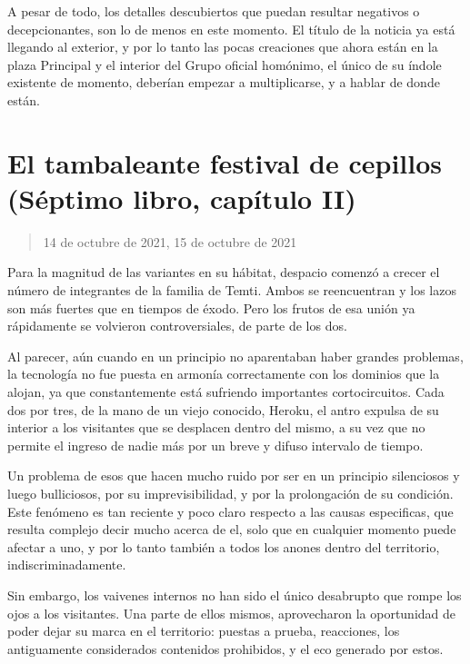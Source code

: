 \documentclass[
]{book}
\begin{document}
A pesar de todo, los detalles descubiertos que puedan resultar negativos o decepcionantes, son lo de menos en este momento. El título de la noticia ya está llegando al exterior, y por lo tanto las pocas creaciones que ahora están en la plaza Principal y el interior del Grupo oficial homónimo, el único de su índole existente de momento, deberían empezar a multiplicarse, y a hablar de donde están.

\hypertarget{el-tambaleante-festival-de-cepillos-suxe9ptimo-libro-capuxedtulo-ii}{%
\section{El tambaleante festival de cepillos (Séptimo libro, capítulo II)}\label{el-tambaleante-festival-de-cepillos-suxe9ptimo-libro-capuxedtulo-ii}}

\begin{quote}
14 de octubre de 2021, 15 de octubre de 2021
\end{quote}

Para la magnitud de las variantes en su hábitat, despacio comenzó a crecer el número de integrantes de la familia de Temti. Ambos se reencuentran y los lazos son más fuertes que en tiempos de éxodo. Pero los frutos de esa unión ya rápidamente se volvieron controversiales, de parte de los dos.

Al parecer, aún cuando en un principio no aparentaban haber grandes problemas, la tecnología no fue puesta en armonía correctamente con los dominios que la alojan, ya que constantemente está sufriendo importantes cortocircuitos. Cada dos por tres, de la mano de un viejo conocido, Heroku, el antro expulsa de su interior a los visitantes que se desplacen dentro del mismo, a su vez que no permite el ingreso de nadie más por un breve y difuso intervalo de tiempo.

Un problema de esos que hacen mucho ruido por ser en un principio silenciosos y luego bulliciosos, por su imprevisibilidad, y por la prolongación de su condición. Este fenómeno es tan reciente y poco claro respecto a las causas especificas, que resulta complejo decir mucho acerca de el, solo que en cualquier momento puede afectar a uno, y por lo tanto también a todos los anones dentro del territorio, indiscriminadamente.

Sin embargo, los vaivenes internos no han sido el único desabrupto que rompe los ojos a los visitantes. Una parte de ellos mismos, aprovecharon la oportunidad de poder dejar su marca en el territorio: puestas a prueba, reacciones, los antiguamente considerados contenidos prohibidos, y el eco generado por estos.
\end{document}
